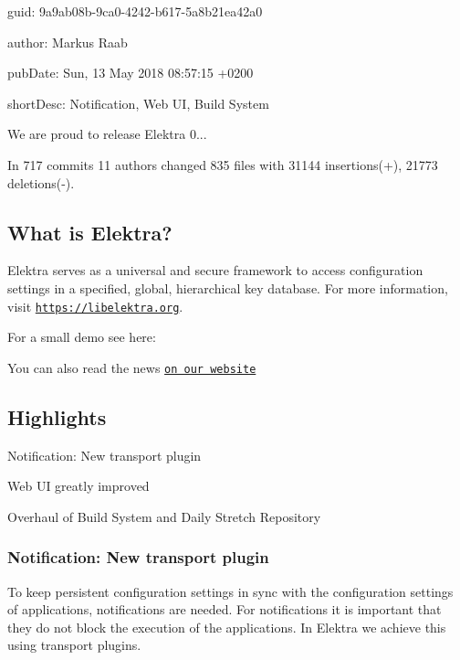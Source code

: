 
\begin{DoxyItemize}
\item guid\+: 9a9ab08b-\/9ca0-\/4242-\/b617-\/5a8b21ea42a0
\item author\+: Markus Raab
\item pub\+Date\+: Sun, 13 May 2018 08\+:57\+:15 +0200
\item short\+Desc\+: Notification, Web UI, Build System
\end{DoxyItemize}

We are proud to release Elektra 0...

In 717 commits 11 authors changed 835 files with 31144 insertions(+), 21773 deletions(-\/).

\subsection*{What is Elektra?}

Elektra serves as a universal and secure framework to access configuration settings in a specified, global, hierarchical key database. For more information, visit \href{https://libelektra.org}{\tt https\+://libelektra.\+org}.

For a small demo see here\+:

\href{https://asciinema.org/a/cantr04assr4jkv8v34uz9b8r}{\tt }

You can also read the news \href{https://www.libelektra.org/news/0.8.23-release}{\tt on our website}

\subsection*{Highlights}


\begin{DoxyItemize}
\item Notification\+: New transport plugin
\item Web UI greatly improved
\item Overhaul of Build System and Daily Stretch Repository
\end{DoxyItemize}

\subsubsection*{Notification\+: New transport plugin}

To keep persistent configuration settings in sync with the configuration settings of applications, notifications are needed. For notifications it is important that they do not block the execution of the applications. In Elektra we achieve this using transport plugins.

